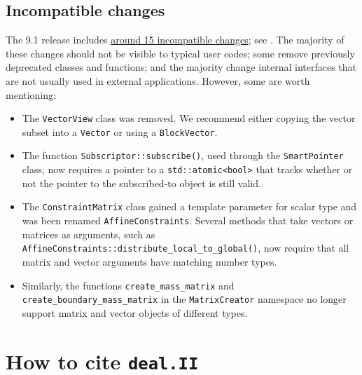 \documentclass{ansarticle-preprint}
\newcommand{\specialword}[1]{\texttt{#1}}
\newcommand{\dealii}{{\specialword{deal.II}}\xspace}
\begin{document}
\subsection{Incompatible changes}

The 9.1 release includes
\href{https://dealii.org/developer/doxygen/deal.II/changes_between_9_0_1_and_9_1_0.html}
     {around 15 incompatible changes}; see \cite{changes91}. The majority of these changes
should not be visible to typical user codes; some remove previously
deprecated classes and functions; and the majority change internal
interfaces that are not usually used in external
applications. However, some are worth mentioning:
\begin{itemize}
\item The \texttt{VectorView} class was removed. We recommend either copying the
      vector subset into a \texttt{Vector} or using a \texttt{BlockVector}.
\item The function \texttt{Subscriptor::subscribe()}, used through the
  \texttt{SmartPointer} class, now requires a pointer to a
      \texttt{std::atomic<bool>} that tracks whether or not the pointer to the
      subscribed-to object is still valid.
\item The \texttt{ConstraintMatrix} class gained a template parameter for scalar
      type and was been renamed \texttt{AffineConstraints}. Several methods that
      take vectors or matrices as arguments,
      such as \texttt{AffineConstraints::distribute\_local\_to\_global()},
      now require that all matrix and vector arguments have matching number
      types.
\item Similarly, the functions \texttt{create\_mass\_matrix} and
      \texttt{create\_boundary\_mass\_matrix} in the \texttt{MatrixCreator}
      namespace no longer
      support matrix and vector objects of different types.
\end{itemize}



\section{How to cite \dealii}\label{sec:cite}
\end{document}
